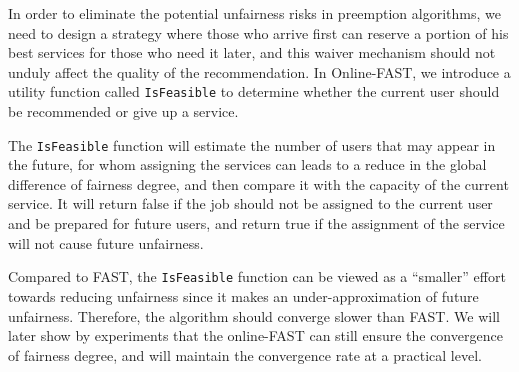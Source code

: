 In order to eliminate the potential unfairness risks in preemption algorithms, we need to design a strategy where those who arrive first can reserve a portion of his best services for those who need it later, and this waiver mechanism should not unduly affect the quality of the recommendation. In Online-FAST, we introduce a utility function called \texttt{IsFeasible} to determine whether the current user should be recommended or give up a service.


The \texttt{IsFeasible} function will estimate the number of users that may appear in the future, for whom assigning the services can leads to a reduce in the global difference of fairness degree, and then compare it with the capacity of the current service. It will return false if the job should not be assigned to the current user and be prepared for future users, and return true if the assignment of the service will not cause future unfairness. 

Compared to FAST, the \texttt{IsFeasible} function can be viewed as a ``smaller'' effort towards reducing unfairness since it makes an under-approximation of future unfairness. Therefore, the algorithm should converge slower than FAST. We will later show by experiments that the online-FAST can still ensure the convergence of fairness degree, and will maintain the convergence rate at a practical level.
